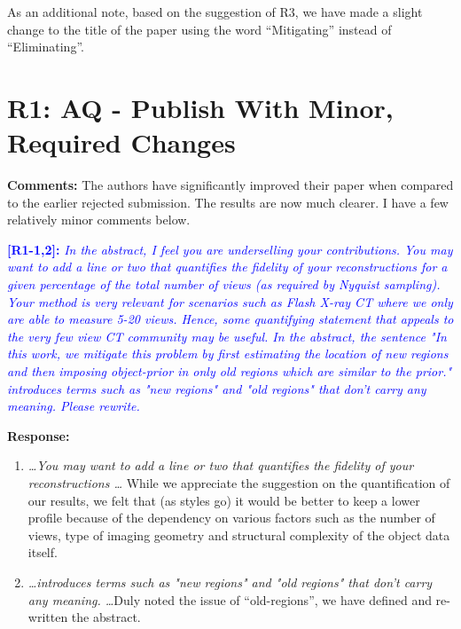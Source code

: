 \documentclass[11pt]{article}
\begin{document}
  As an additional note, based on the suggestion of R3, we have made a
  slight change to the title of the paper using the word
  ``Mitigating'' instead of ``Eliminating''.
  
  \section{R1: AQ - Publish With Minor, Required
    Changes} 

  \textbf{Comments:} The authors have significantly improved their
  paper when compared to the earlier rejected submission. The results
  are now much clearer. I have a few relatively minor comments below.

  \vspace{0.5cm}\textcolor{blue}{\textbf{[R1-1,2]:} \textit{In
      the abstract, I feel you are underselling your
      contributions. You may want to add a line or two that quantifies
      the fidelity of your reconstructions for a given percentage of
      the total number of views (as required by Nyquist
      sampling). Your method is very relevant for scenarios such as
      Flash X-ray CT where we only are able to measure 5-20
      views. Hence, some quantifying statement that appeals to the
      very few view CT community may be useful. In the abstract, the
      sentence "In this work, we mitigate this problem by first
      estimating the location of new regions and then imposing
      object-prior in only old regions which are similar to the
      prior." introduces terms such as "new regions" and "old regions"
      that don't carry any meaning. Please rewrite.}}

  \textbf{Response:}

  
\begin{enumerate}

  \item \emph {\ldots You may want to add a line or two that quantifies
      the fidelity of your reconstructions \ldots} While we appreciate the suggestion on the quantification of our
  results, we felt that (as styles go) it would be better to keep a
  lower profile because of the dependency on various factors such as
  the number of views, type of imaging geometry and structural complexity of the object data
  itself.
\item \emph{ \ldots introduces terms such as "new regions" and "old regions"
      that don't carry any meaning. \ldots }Duly noted the issue of ``old-regions'', we have defined and
  re-written the  abstract. 


  \end{enumerate}
\end{document}
